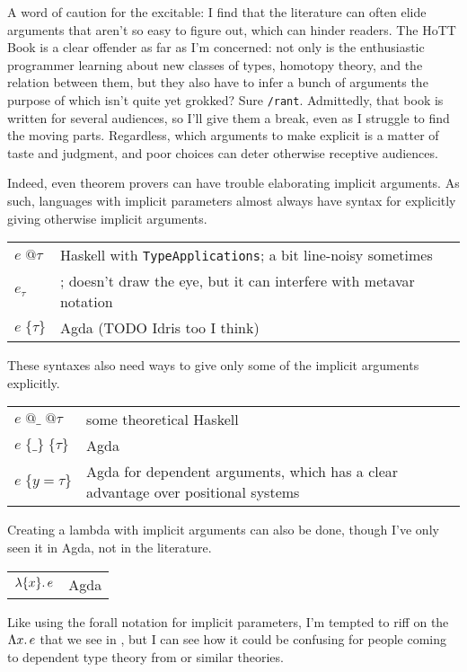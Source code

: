 \documentclass[11pt]{article} %
\theoremstyle{definition}
\theoremstyle{remark}
\begin{document}
A word of caution for the excitable: I find that the literature can often elide arguments that aren't so easy to figure out, which can hinder readers.
The HoTT Book\cite{hottbook} is a clear offender as far as I'm concerned: not only is the enthusiastic programmer learning about new classes of types, homotopy theory, and the relation between them, but they also have to infer a bunch of arguments the purpose of which isn't quite yet grokked?
Sure \verb!/rant!.
Admittedly, that book is written for several audiences, so I'll give them a break, even as I struggle to find the moving parts.
Regardless, which arguments to make explicit is a matter of taste and judgment, and poor choices can deter otherwise receptive audiences.

Indeed, even theorem provers can have trouble elaborating implicit arguments.
As such, languages with implicit parameters almost always have syntax for explicitly giving otherwise implicit arguments.
\begin{center}
\renewcommand{\arraystretch}{1.2}
\begin{tabular}{lp{8.2cm}}
$e\;@\tau$ & Haskell with \texttt{TypeApplications}; a bit line-noisy sometimes \\
$e_\tau$ & \cite{hottbook}; doesn't draw the eye, but it can interfere with metavar notation \\
$e\;\{\tau\}$ & Agda (TODO Idris too I think) \\
\end{tabular}
\end{center}
These syntaxes also need ways to give only some of the implicit arguments explicitly.
\begin{center}
\renewcommand{\arraystretch}{1.2}
\begin{tabular}{lp{8.2cm}}
$e\;@\_\;@\tau$ & some theoretical Haskell \\
$e\;\{\_\}\;\{\tau\}$ & Agda \\
$e\;\{y = \tau\}$ & Agda for dependent arguments, which has a clear advantage over positional systems \\
\end{tabular}
\end{center}

Creating a lambda with implicit arguments can also be done, though I've only seen it in Agda, not in the literature.
\begin{center}
\renewcommand{\arraystretch}{1.2}
\begin{tabular}{lp{8.2cm}}
${\lambda}{\{x\}}.\,e$ & Agda \\
\end{tabular}
\end{center}
Like using the forall notation for implicit parameters, I'm tempted to riff on the ${\Lambda}{x}.\,e$ that we see in \SystemF{}, but I can see how it could be confusing for people coming to dependent type theory from \SystemF{} or similar theories.
\end{document}
